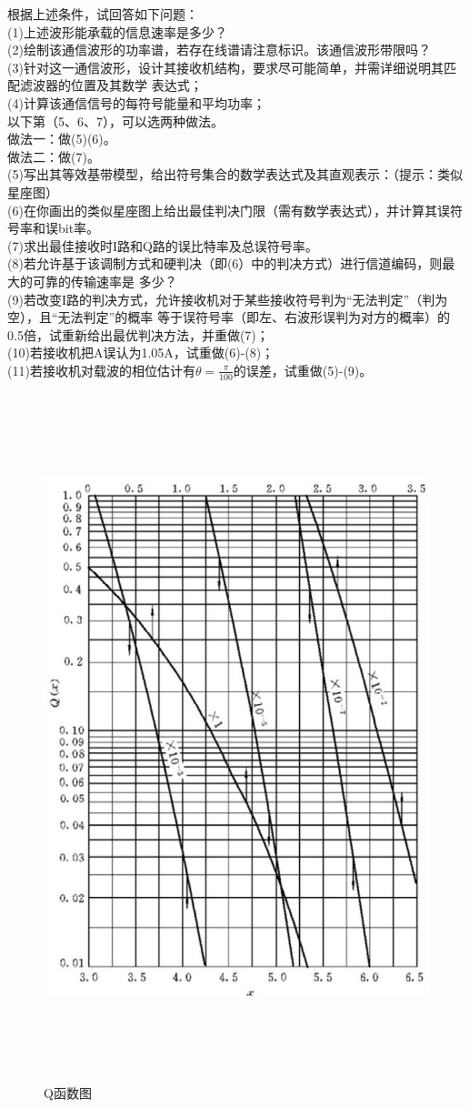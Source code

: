 \documentclass[UTF8]{ctexart}
\begin{document}
根据上述条件，试回答如下问题：\\
(1)上述波形能承载的信息速率是多少？\\
(2)绘制该通信波形的功率谱，若存在线谱请注意标识。该通信波形带限吗？\\
(3)针对这一通信波形，设计其接收机结构，要求尽可能简单，并需详细说明其匹配滤波器的位置及其数学
表达式；\\
(4)计算该通信信号的每符号能量和平均功率；\\
以下第（5、6、7），可以选两种做法。\\
做法一：做(5)(6)。\\
做法二：做(7)。\\
(5)写出其等效基带模型，给出符号集合的数学表达式及其直观表示：（提示：类似星座图）\\
(6)在你画出的类似星座图上给出最佳判决门限（需有数学表达式），并计算其误符号率和误bit率。\\
(7)求出最佳接收时I路和Q路的误比特率及总误符号率。\\
(8)若允许基于该调制方式和硬判决（即(6）中的判决方式）进行信道编码，则最大的可靠的传输速率是
多少？\\
(9)若改变I路的判决方式，允许接收机对于某些接收符号判为“无法判定”（判为空），且“无法判定”的概率
等于误符号率（即左、右波形误判为对方的概率）的0.5倍，试重新给出最优判决方法，并重做(7)；\\
(10)若接收机把A误认为1.05A，试重做(6)-(8)；\\
(11)若接收机对载波的相位估计有$\theta=\frac{\pi}{100}$的误差，试重做(5)-(9)。\\
\begin{figure}[H]
  \centering
  \includegraphics[width=15cm,height=20cm]{3_5.jpg}
  \caption*{Q函数图}
\end{figure}
\end{document}
